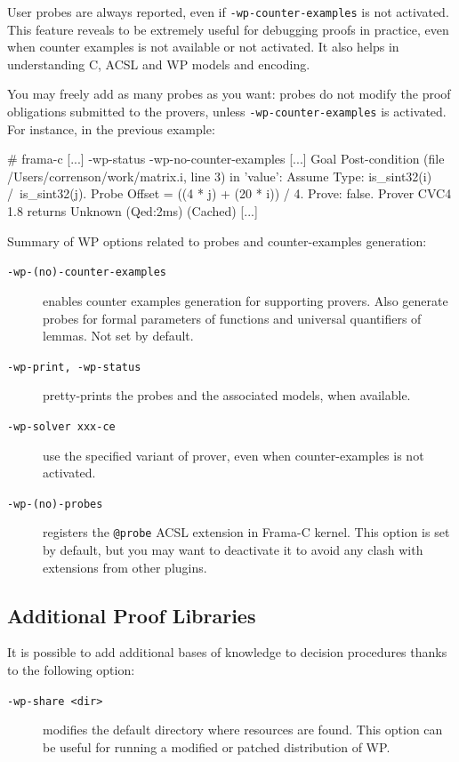 User probes are always reported, even if \verb+-wp-counter-examples+ is not
activated. This feature reveals to be extremely useful for debugging proofs in
practice, even when counter examples is not available or not activated. It also
helps in understanding \textsf{C}, \textsf{ACSL} and \textsf{WP} models and
encoding.

You may freely add as many probes as you want: probes do not modify the
proof obligations submitted to the provers, unless \verb+-wp-counter-examples+
is activated. For instance, in the previous example:

\begin{shell}
  # frama-c [...] -wp-status -wp-no-counter-examples
  [...]
  Goal Post-condition (file /Users/correnson/work/matrix.i, line 3) in 'value':
  Assume {
    Type: is_sint32(i) /\ is_sint32(j).
    Probe Offset = ((4 * j) + (20 * i)) / 4.
  }
  Prove: false.
  Prover CVC4 1.8 returns Unknown (Qed:2ms) (Cached)
  [...]
\end{shell}

\noindent
Summary of \textsf{WP} options related to probes and counter-examples generation:
\begin{description}
\item[\tt -wp-(no)-counter-examples] enables counter examples generation for
  supporting provers. Also generate probes for formal parameters of functions
  and universal quantifiers of lemmas. Not set by default.
\item[\tt -wp-print, -wp-status] pretty-prints the probes and the associated models,
  when available.
\item[\tt -wp-solver xxx-ce] use the specified variant of prover, even
  when counter-examples is not activated.
\item[\tt -wp-(no)-probes] registers the \verb+@probe+ \textsf{ACSL}
  extension in \textsf{Frama-C} kernel.
  This option is set by default, but you may want to deactivate it to
  avoid any clash with extensions from other plugins.
\end{description}

\subsection{Additional Proof Libraries}
\label{prooflibs}

It is possible to add additional bases of knowledge to decision
procedures thanks to the following option:
\begin{description}
\item[\tt -wp-share <dir>] modifies the default directory where
  resources are found.  This option can be useful for running a modified or
  patched distribution of \textsf{WP}.
\end{description}

